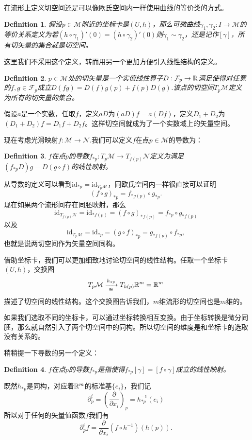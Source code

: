 \documentclass[11pt]{extbook}
\theoremstyle{plain}%
\newtheorem{defi}{Definition}[section]%
\begin{document}
在流形上定义切空间还是可以像欧氏空间内一样使用曲线的等价类的方式。
\begin{defi}
假设$p\in \mathcal{M}$附近的坐标卡是$(U,h)$，那么可微曲线$\gamma_1,\gamma_2:I\to \mathcal{M}$的等价关系定义为若$(h\circ\gamma_1)'(0)=(h\circ\gamma_2)'(0)$则$\gamma_1\sim\gamma_2$，还是记作$\left[\gamma\right]$，所有切矢量的集合就是切空间。
\end{defi}
这里我们不采用这个定义，转而用另一个更加方便引入线性结构的定义。

\begin{defi}
$p\in \mathcal{M}$处的切矢量是一个实值线性算子$D:\mathcal{F}_p\to\mathbb{R}$满足使得对任意的$f,g\in \mathcal{F}_p$成立$D(fg)=D(f)g(p)+f(p)D(g)$.该点的切空间$T_p\mathcal{M}$定义为所有的切矢量的集合。
\end{defi}
假设$a$是一个实数，任取$f$，定义$aD$为$(aD)f=a(Df)$，定义$D_1+D_2$为$(D_1+D_2)f=D_1f+D_2f$。这样切空间就成为了一个实数域上的矢量空间。

现在考虑光滑映射$f:\mathcal{M}\to \mathcal{N}$.我们可以定义$f$在点$p \in \mathcal{M}$的导数为：
\begin{defi}
	$f$在点$p$的导数$f_{*p}:T_p\mathcal{M} \to T_{f(p)}\mathcal{N}$定义为满足$\left(f_{*p}D\right)g=D(g\circ f)$的线性映射。
\end{defi}

从导数的定义可以看到$\mathrm{id}_{*p}=\mathrm{id}_{T_p\mathcal{M}}$，同欧氏空间内一样很直接可以证明\[(f\circ g)_{*p}=f_{*g(p)}\circ g_{*p}.\]
现在如果两个流形间存在同胚映射，那么
\[\mathrm{id}_{T_{f(p)}\mathcal{N}}=\mathrm{id}_{*f(p)}=(f\circ g)_{*f(p)}=f_{*p}\circ g_{*f(p)}\]
以及
\[\mathrm{id}_{T_p\mathcal{M}}=\mathrm{id}_{*p}=(g\circ f)_{*p}=g_{*f(p)}\circ f_{*p},\]
也就是说两切空间作为矢量空间同构。

借助坐标卡，我们可以更加细致地讨论切空间的线性结构。任取一个坐标卡$(U,h)$，交换图
\[
	T_{p}\mathcal{M}\xrightarrow[\cong]{h_{*p}}T_{h(p)}\mathbb{R}^m=\mathbb{R}^m
\]
描述了切空间的线性结构。这个交换图告诉我们，$m$维流形的切空间也是$m$维的。

如果我们选取不同的坐标卡，可以通过坐标转换相互变换。由于坐标转换是微分同胚，那么就自然引入了两个切空间中的同构。所以切空间的维度是和坐标卡的选取没有关系的。

稍稍提一下导数的另一个定义：
\begin{defi}
	$f$在点$p$的导数$f_{*p}$是指使得$f_{*p}[\gamma]=\left[f\circ \gamma\right]$成立的线性映射。
\end{defi}

既然$h_{*p}$是同构，对应着$\mathbb{R}^m$的标准基$\{e_i\}$，我们记
\[
	\partial^i_p=\left(\frac{\partial}{\partial x_i}\right)_p=h_{*p}^{-1}\left(e_i\right)
\]
所以对于任何的矢量值函数$f$我们有
\[
	\partial^i_pf=\frac{\partial}{\partial x_i}\left(f\circ h^{-1}\right)(h(p)).
\]
\end{document}
